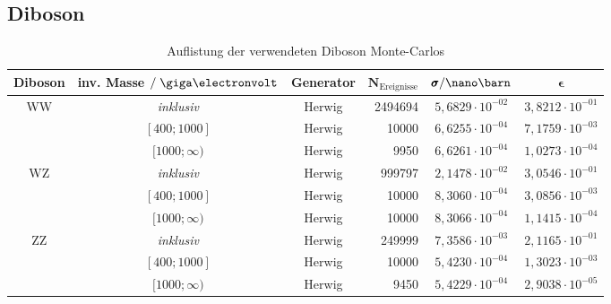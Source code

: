 \subsection*{Diboson} 
\begin{table}[h]
    \footnotesize
    \centering
    \begin{tabular}{|c|c|c|r|c|c|}
        \hline
        \bf{Diboson} & \bf{inv. Masse} $/\GeV$ & \bf{Generator} & $\pmb N_\text{Ereignisse}$ &
        $\pmb\sigma / \nano\barn$ & $\pmb\epsilon$ \\
        \hline \hline
        \multirow{3}{*}{WW}
            & \it{inklusiv}     & Herwig & 2494694 & $5,6829\cdot 10^{-02}$ & $3,8212\cdot 10^{-01}$ \\
            & $[400 ; 1000]$    & Herwig & 10000   & $6,6255\cdot 10^{-04}$ & $7,1759\cdot 10^{-03}$ \\
            & $[1000 ; \infty)$ & Herwig & 9950    & $6,6261\cdot 10^{-04}$ & $1,0273\cdot 10^{-04}$ \\
        \hline
        \multirow{3}{*}{WZ}
            & \it{inklusiv}     & Herwig & 999797  & $2,1478\cdot 10^{-02}$ & $3,0546\cdot 10^{-01}$ \\
            & $[400 ; 1000]$    & Herwig & 10000   & $8,3060\cdot 10^{-04}$ & $3,0856\cdot 10^{-03}$ \\
            & $[1000 ; \infty)$ & Herwig & 10000   & $8,3066\cdot 10^{-04}$ & $1,1415\cdot 10^{-04}$ \\
        \hline
        \multirow{3}{*}{ZZ}
            & \it{inklusiv}     & Herwig & 249999  & $7,3586\cdot 10^{-03}$ & $2,1165\cdot 10^{-01}$ \\
            & $[400 ; 1000]$    & Herwig & 10000   & $5,4230\cdot 10^{-04}$ & $1,3023\cdot 10^{-03}$ \\
            & $[1000 ; \infty)$ & Herwig & 9450    & $5,4229\cdot 10^{-04}$ & $2,9038\cdot 10^{-05}$ \\
        \hline
    \end{tabular}
    \caption{Auflistung der verwendeten Diboson Monte-Carlos} 
\end{table}
\FloatBarrier



